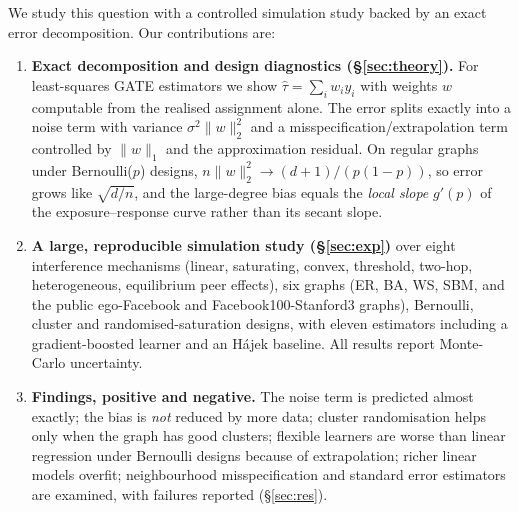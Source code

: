We study this question with a controlled simulation study backed by an exact error decomposition. Our contributions are:
\begin{enumerate}[leftmargin=*,itemsep=0pt,topsep=1pt]
\item \textbf{Exact decomposition and design diagnostics (\S\ref{sec:theory}).} For least-squares GATE estimators we show $\hat\tau=\sum_i w_iy_i$ with weights $w$ computable from the realised assignment alone. The error splits exactly into a noise term with variance $\sigma^2\|w\|_2^2$ and a misspecification/extrapolation term controlled by $\|w\|_1$ and the approximation residual. On regular graphs under Bernoulli($p$) designs, $n\|w\|_2^2\to(d+1)/(p(1-p))$, so error grows like $\sqrt{d/n}$, and the large-degree bias equals the \emph{local slope} $g'(p)$ of the exposure--response curve rather than its secant slope.
\item \textbf{A large, reproducible simulation study (\S\ref{sec:exp})} over eight interference mechanisms (linear, saturating, convex, threshold, two-hop, heterogeneous, equilibrium peer effects), six graphs (ER, BA, WS, SBM, and the public ego-Facebook and Facebook100-Stanford3 graphs), Bernoulli, cluster and randomised-saturation designs, with eleven estimators including a gradient-boosted learner and an H\'ajek baseline. All results report Monte-Carlo uncertainty.
\item \textbf{Findings, positive and negative.} The noise term is predicted almost exactly; the bias is \emph{not} reduced by more data; cluster randomisation helps only when the graph has good clusters; flexible learners are worse than linear regression under Bernoulli designs because of extrapolation; richer linear models overfit; neighbourhood misspecification and standard error estimators are examined, with failures reported (\S\ref{sec:res}).
\end{enumerate}
